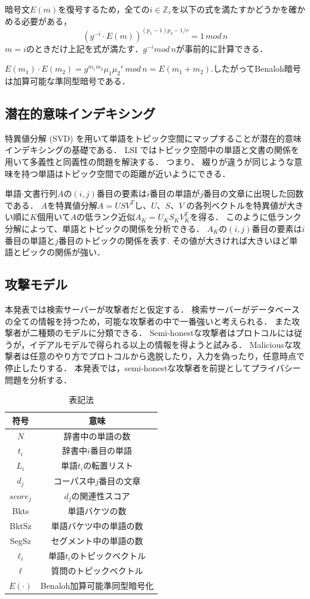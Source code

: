 \documentclass{jsarticle}
\theoremstyle{definition}
\begin{document}
暗号文$E(m)$を復号するため，全ての$i \in \mathbb{Z}_r$を以下の式を満たすかどうかを確かめる必要がある，
\begin{equation}
(g^{-i} \cdot E(m))^{(p_1-1){p_2-1}/r} = 1 \, mod \, n
\end{equation}
$m=i$のときだけ上記を式が満たす．$g^{-i} mod \, n $が事前的に計算できる．

$E(m_1)\cdot E(m_2) = g^{m_1m_2}{\mu_1\mu_2}^r \, mod \, n = E(m_1 + m_2)$.したがってBenaloh暗号は加算可能な準同型暗号である．

\subsection{潜在的意味インデキシング}\label{LSI}
特異値分解 (SVD) を用いて単語をトピック空間にマップすることが潜在的意味インデキシングの基礎である\cite{}．
LSI ではトピック空間中の単語と文書の関係を用いて多義性と同義性の問題を解決する．
つまり、 綴りが違うが同じような意味を持つ単語はトピック空間での距離が近いようにできる．

単語$\cdot$文書行列$A$の$(i,j)$番目の要素は$i$番目の単語が$j$番目の文章に出現した回数である．
$A$を特異値分解$A = USV^T$し、$U$、$S$、$V$	の各列ベクトルを特異値が大きい順に$K$個用いて$A$の低ランク近似$A_K=U_KS_KV_{K}^T$を得る．
このように低ランク分解によって、単語とトピックの関係を分析できる．
$A_K$の$(i,j)$番目の要素は$i$番目の単語と$j$番目のトピックの関係を表す.
その値が大きければ大きいほど単語とピックの関係が強い．

\subsection{攻撃モデル}
本発表では検索サーバーが攻撃者だと仮定する．
検索サーバーがデータベースの全ての情報を持つため，可能な攻撃者の中で一番強いと考えられる．
また攻撃者が二種類のモデルに分類できる．
Semi-honestな攻撃者はプロトコルには従うが，イデアルモデルで得られる以上の情報を得ようと試みる．
Maliciousな攻撃者は任意のやり方でプロトコルから逸脱したり，入力を偽ったり，任意時点で停止したりする．
本発表では，semi-honestな攻撃者を前提としてプライバシー問題を分析する．

\begin{table}[!hbp]
\center
\begin{tabular}{|c|c|}
\hline
符号 & 意味 \\
\hline
$N$ & 辞書中の単語の数 \\
$t_i$ & 辞書中$i$番目の単語 \\
$L_i$ & 単語$t_i$の転置リスト \\
$d_j$ & コーパス中$j$番目の文章 \\
$score_j$ & $d_j$の関連性スコア \\
Bkts & 単語バケツの数 \\
BktSz & 単語バケツ中の単語の数 \\
SegSz & セグメント中の単語の数 \\
$\ell_i$ & 単語$t_i$のトピックベクトル \\
$\ell$ & 質問のトピックベクトル \\
$E(\cdot)$ & Benaloh加算可能準同型暗号化 \\
\hline
\end{tabular}
\caption{表記法}
\end{table}
\end{document}
